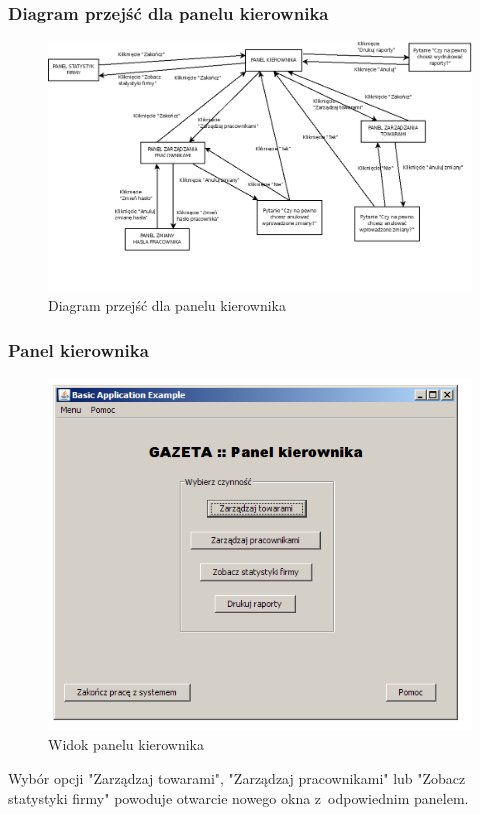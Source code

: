 \subsubsection{Diagram przejść dla panelu kierownika}
\begin{figure}[h]
\begin{center}
\includegraphics[width=15cm,angle=90,keepaspectratio]{gfx/przejscia_szef.png}
\caption{Diagram przejść dla panelu kierownika}
\end{center}
\end{figure}
\clearpage
\subsubsection{Panel kierownika}
\begin{figure}[h]
\includegraphics[width=1\textwidth]{gfx/szef_szefow.png}
\caption{Widok panelu kierownika}
\end{figure}
Wybór opcji "Zarządzaj towarami", "Zarządzaj pracownikami" lub "Zobacz statystyki firmy" powoduje otwarcie nowego okna z~odpowiednim panelem.

